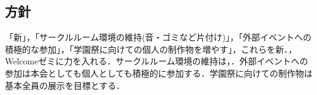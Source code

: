 \subsection*{\newGradeIfKouki{}\secondGrade{}方針}


「新」，「サークルルーム環境の維持(音・ゴミなど片付け)」，「外部イベントへの積極的な参加」，「学園祭に向けての個人の制作物を増やす」，これらを新．，Welcomeゼミに力を入れる．サークルルーム環境の維持は，．外部イベントへの参加は本会としても個人としても積極的に参加する．学園祭に向けての制作物は基本全員の展示を目標とする．
